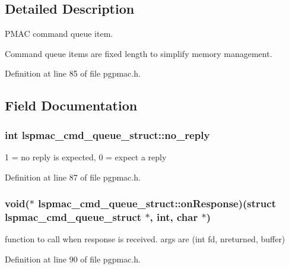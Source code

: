\subsection{Detailed Description}
P\-M\-A\-C command queue item. 

Command queue items are fixed length to simplify memory management. 

Definition at line 85 of file pgpmac.\-h.



\subsection{Field Documentation}
\hypertarget{structlspmac__cmd__queue__struct_a33f70b45f8b7c27935cd3efe28748479}{
\subsubsection[{no\-\_\-reply}]{\setlength{\rightskip}{0pt plus 5cm}int lspmac\-\_\-cmd\-\_\-queue\-\_\-struct\-::no\-\_\-reply}}\label{structlspmac__cmd__queue__struct_a33f70b45f8b7c27935cd3efe28748479}


1 = no reply is expected, 0 = expect a reply 



Definition at line 87 of file pgpmac.\-h.

\hypertarget{structlspmac__cmd__queue__struct_a08f734865cf7ba341b8666da35ba7d84}{
\subsubsection[{on\-Response}]{\setlength{\rightskip}{0pt plus 5cm}void($\ast$ lspmac\-\_\-cmd\-\_\-queue\-\_\-struct\-::on\-Response)(struct {\bf lspmac\-\_\-cmd\-\_\-queue\-\_\-struct} $\ast$, int, char $\ast$)}}\label{structlspmac__cmd__queue__struct_a08f734865cf7ba341b8666da35ba7d84}


function to call when response is received. args are (int fd, nreturned, buffer) 



Definition at line 90 of file pgpmac.\-h.

